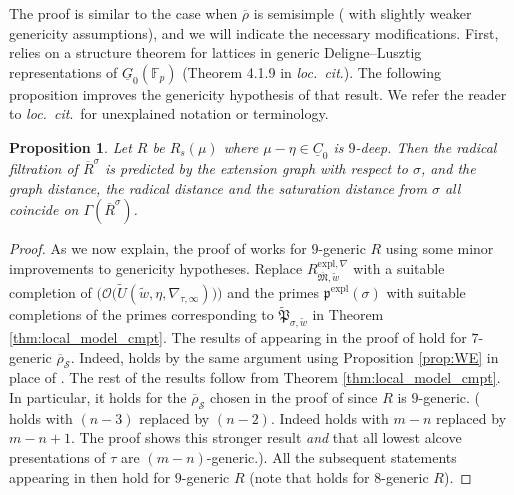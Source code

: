 \documentclass[oneside,a4paper,english, 11pt]{amsart}
\theoremstyle{plain}
\theoremstyle{plain}
\newtheorem{prop}[thm]{Proposition}
\theoremstyle{plain}
\theoremstyle{plain}
\theoremstyle{plain}
\theoremstyle{plain}
\theoremstyle{definition}
\theoremstyle{definition}
\theoremstyle{definition}
\theoremstyle{remark}
\numberwithin{equation}{section}
\newcommand{\F}{\mathbb{F}}
\newcommand{\fM}{\mathfrak{M}}
\newcommand{\fP}{\mathfrak{P}}
\newcommand{\fp}{\mathfrak{p}}
\newcommand{\cO}{\mathcal{O}}
\newcommand{\cS}{\mathcal{S}}
\newcommand{\Fp}{\F_p}
\newcommand{\un}[1]{\underline{#1}}
\newcommand{\tld}[1]{\widetilde{#1}}
\newcommand{\rhobar}{\overline{\rho}}
\newcommand{\ovl}[1]{\overline{#1}}
\begin{document}
\noindent The proof is similar to the case when $\rhobar$ is semisimple (\cite[Theorem 5.1.1]{LLLM2} with slightly weaker genericity assumptions), and we will indicate the necessary modifications.
First, \cite[Theorem 5.1.1]{LLLM2} relies on a structure theorem for lattices in generic Deligne--Lusztig representations of $\un{G}_0(\Fp)$ (Theorem 4.1.9 in \emph{loc.~cit}.).
The following proposition improves the genericity hypothesis of that result. 
We refer the reader to \emph{loc.~cit}.~for unexplained notation or terminology.
\begin{prop}
\label{prop:lattice:10-gen}
Let $R$ be $R_s(\mu)$ where $\mu-\eta \in \un{C}_0$ is $9$-deep. %
%
Then the radical filtration of $\ovl{R}^\sigma$ is predicted by the extension graph with respect to $\sigma$, and the graph distance, the radical distance and the saturation distance from $\sigma$ all coincide on $\Gamma(\ovl{R}^\sigma)$.
\end{prop}
\begin{proof}
%

%
%

As we now explain, the proof of \cite[Proposition 4.3.7]{LLLM2} works for $9$-generic $R$ using some minor improvements to genericity hypotheses. 
%
Replace $R^{\mathrm{expl},\nabla}_{\ovl{\fM},\tld{w}}$ with a suitable completion of $\Big(\cO\big(\tld{U}(\tld{w},\eta,\nabla_{\tau,\infty})\big)\Big)$ and the primes $\fp^{\mathrm{expl}}(\sigma)$ with suitable completions of the primes corresponding to $\tld{\fP}_{\sigma,\tld{w}}$ in Theorem \ref{thm:local_model_cmpt}. 
%
%
The results of \cite[\S 3.5, 3.6]{LLLM2} appearing in the proof of \cite[Proposition 4.3.7]{LLLM2} hold for $7$-generic $\rhobar_{\cS}$. 
Indeed, \cite[Theorem 3.5.2]{LLLM2} holds by the same argument using Proposition \ref{prop:WE} in place of \cite[Proposition 3.5.6]{LLLM2}. 
The rest of the results follow from Theorem \ref{thm:local_model_cmpt}. 
In particular, it holds for the $\rhobar_{\cS}$ chosen in the proof of \cite[Proposition 4.3.7]{LLLM2} since $R$ is $9$-generic.  (\cite[Proposition 3.4.5]{LLLM2} holds with $(n-3)$ replaced by $(n-2)$. Indeed \cite[Proposition 3.3.2]{LLL} holds with $m-n$ replaced by $m-n+1$. The proof shows this stronger result \emph{and} that all lowest alcove presentations of $\tau$ are $(m-n)$-generic.). 
%
All the subsequent statements appearing in \cite[\S 4.3]{LLLM2} then hold for $9$-generic $R$ (note that \cite[Theorem 4.2.16]{LLLM2} holds for $8$-generic $R$). 
%
%
\end{proof}
\end{document}
